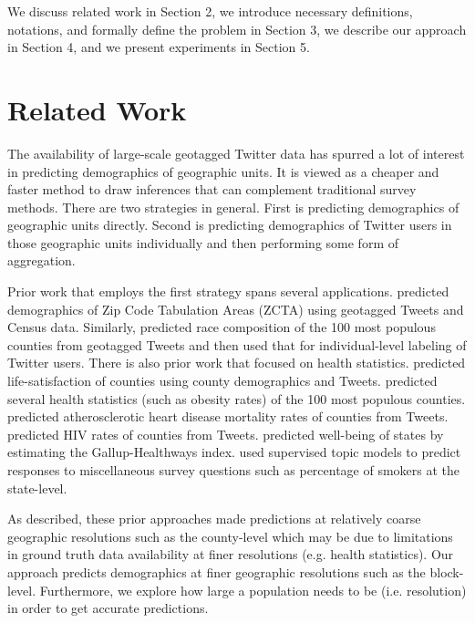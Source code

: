 \documentclass[letterpaper]{article}
\begin{document}
We discuss related work in Section 2, we introduce necessary definitions, notations, and formally define the problem in Section 3, we describe our approach in Section 4, and we present experiments in Section 5.

\section{Related Work}

\noindent The availability of large-scale geotagged Twitter data has spurred a lot of interest in predicting demographics of geographic units. It is viewed as a cheaper and faster method to draw inferences that can complement traditional survey methods. There are two strategies in general. First is predicting demographics of geographic units directly. Second is predicting demographics of Twitter users in those geographic units individually and then performing some form of aggregation.

Prior work that employs the first strategy spans several applications. \citeauthor{eisenstein2011discovering}  predicted demographics of Zip Code Tabulation Areas (ZCTA) using geotagged Tweets and Census data. Similarly, \citeauthor{mohammady2014using}  predicted race composition of the 100 most populous counties from geotagged Tweets and then used that for individual-level labeling of Twitter users. There is also prior work that focused on health statistics. \citeauthor{schwartz2013characterizing}  predicted life-satisfaction of counties using county demographics and Tweets. \citeauthor{culotta2014estimating}  predicted several health statistics (such as obesity rates) of the 100 most populous counties. \citeauthor{eichstaedt2015psychological}  predicted atherosclerotic heart disease mortality rates of counties from Tweets. \citeauthor{ireland2015future}  predicted HIV rates of counties from Tweets. \citeauthor{loff2015predicting}  predicted well-being of states by estimating the Gallup-Healthways index. \citeauthor{benton2016collective}  used supervised topic models to predict responses to miscellaneous survey questions such as percentage of smokers at the state-level.

As described, these prior approaches made predictions at relatively coarse geographic resolutions such as the county-level which may be due to limitations in ground truth data availability at finer resolutions (e.g. health statistics). Our approach predicts demographics at finer geographic resolutions such as the block-level. Furthermore, we explore how large a population needs to be (i.e. resolution) in order to get accurate predictions.
\end{document}
